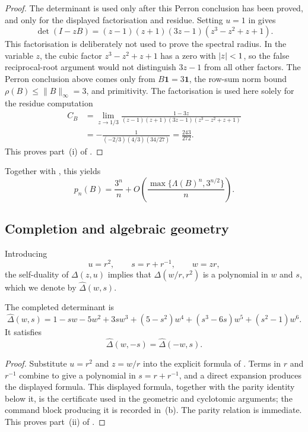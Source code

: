 \begin{proof}
The determinant is used only after this Perron conclusion has been
proved, and only for the displayed factorisation and residue. Setting
\(u=1\) in
 gives
\[
  \det(I-zB)=(z-1)(z+1)(3z-1)(z^3-z^2+z+1).
\]
This factorisation is deliberately not used to prove the spectral
radius. In the variable \(z\), the cubic factor \(z^3-z^2+z+1\) has a
zero with \(\lvert z \rvert<1\), so the false reciprocal-root argument would not
distinguish \(3z-1\) from all other factors. The Perron conclusion above
comes only from \(B\mathbf1=3\mathbf1\), the row-sum norm bound
\(\rho(B)\le\|B\|_\infty=3\), and primitivity. The factorisation is used
here solely for the residue computation
\[
  \begin{aligned}
  C_B
  &=\lim_{z\to1/3}
    \frac{1-3z}{(z-1)(z+1)(3z-1)(z^3-z^2+z+1)}  \\
  &=-\frac{1}{(-2/3)(4/3)(34/27)}
    =\frac{243}{272}.
  \end{aligned}
\]
This proves part~\textup{(i)} of
.
\end{proof}


Together with , this yields
\[
  p_n(B)=\frac{3^n}{n}
  +O\!\left(\frac{\max\{\Lambda(B)^n,3^{n/2}\}}{n}\right).
\]


\subsection{Completion and algebraic geometry}

Introducing
\[
  u=r^2,\qquad s=r+r^{-1},\qquad w=zr,
\]
the self-duality of \(\Delta(z,u)\) implies that
\(\Delta(w/r,r^2)\) is a polynomial in \(w\) and \(s\), which we denote
by \(\widehat\Delta(w,s)\).

\begin{proposition}
  \label{prop:sync-hatdelta-completion}
  The completed determinant is
  \[
    \widehat\Delta(w,s)
    =1-sw-5w^2+3sw^3+(5-s^2)w^4+(s^3-6s)w^5+(s^2-1)w^6.
  \]
  It satisfies
  \[
    \widehat\Delta(w,-s)=\widehat\Delta(-w,s).
  \]
\end{proposition}

\begin{proof}
Substitute \(u=r^2\) and \(z=w/r\) into the explicit formula of
. Terms in \(r\) and \(r^{-1}\)
combine to give a polynomial in \(s=r+r^{-1}\), and a direct expansion
produces the displayed formula. This displayed formula, together with
the parity identity below it, is the certificate used in the geometric
and cyclotomic arguments; the command block producing it is
recorded in \,\textup{(b)}. The parity
relation is immediate. This proves part~\textup{(ii)} of
.
\end{proof}

